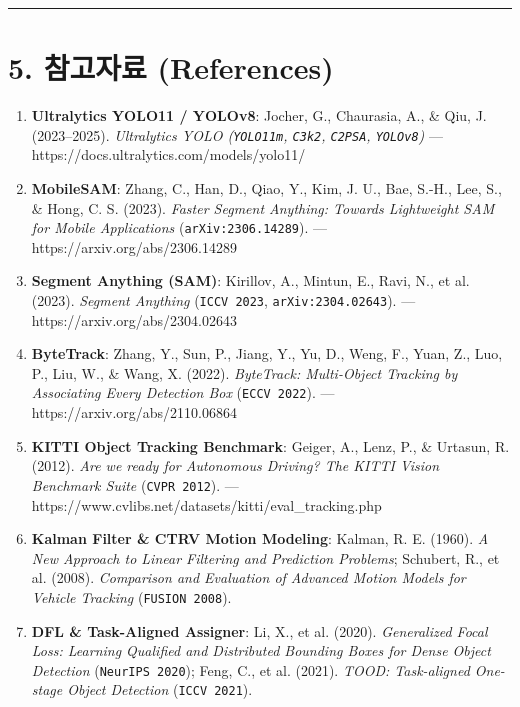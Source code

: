 \documentclass[10.5pt,a4paper]{article}
\begin{document}
\par\noindent\rule{\textwidth}{0.4pt}\par\medskip

\section{5. 참고자료 (References)}

\begin{enumerate}[leftmargin=1.8em,itemsep=2pt]
\item \textbf{Ultralytics YOLO11 / YOLOv8}: Jocher, G., Chaurasia, A., \& Qiu, J. (2023--2025). \textit{Ultralytics YOLO (\texttt{YOLO11m}, \texttt{C3k2}, \texttt{C2PSA}, \texttt{YOLOv8})} --- https:\allowbreak{}/\allowbreak{}/\allowbreak{}docs.\allowbreak{}ultralytics.\allowbreak{}com/\allowbreak{}models/\allowbreak{}yolo11/\allowbreak{}
\item \textbf{MobileSAM}: Zhang, C., Han, D., Qiao, Y., Kim, J. U., Bae, S.-H., Lee, S., \& Hong, C. S. (2023). \textit{Faster Segment Anything: Towards Lightweight SAM for Mobile Applications} (\texttt{arXiv:\allowbreak{}2306.\allowbreak{}14289}).\allowbreak{} --- https:\allowbreak{}/\allowbreak{}/\allowbreak{}arxiv.\allowbreak{}org/\allowbreak{}abs/\allowbreak{}2306.\allowbreak{}14289
\item \textbf{Segment Anything (SAM)}: Kirillov, A., Mintun, E., Ravi, N., et al. (2023). \textit{Segment Anything} (\texttt{ICCV 2023}, \texttt{arXiv:\allowbreak{}2304.\allowbreak{}02643}).\allowbreak{} --- https:\allowbreak{}/\allowbreak{}/\allowbreak{}arxiv.\allowbreak{}org/\allowbreak{}abs/\allowbreak{}2304.\allowbreak{}02643
\item \textbf{ByteTrack}: Zhang, Y., Sun, P., Jiang, Y., Yu, D., Weng, F., Yuan, Z., Luo, P., Liu, W., \& Wang, X. (2022). \textit{ByteTrack: Multi-Object Tracking by Associating Every Detection Box} (\texttt{ECCV 2022}).\allowbreak{} --- https:\allowbreak{}/\allowbreak{}/\allowbreak{}arxiv.\allowbreak{}org/\allowbreak{}abs/\allowbreak{}2110.\allowbreak{}06864
\item \textbf{KITTI Object Tracking Benchmark}: Geiger, A., Lenz, P., \& Urtasun, R. (2012). \textit{Are we ready for Autonomous Driving? The KITTI Vision Benchmark Suite} (\texttt{CVPR 2012}).\allowbreak{} --- https:\allowbreak{}/\allowbreak{}/\allowbreak{}www.\allowbreak{}cvlibs.\allowbreak{}net/\allowbreak{}datasets/\allowbreak{}kitti/\allowbreak{}eval\_\allowbreak{}tracking.\allowbreak{}php
\item \textbf{Kalman Filter \& CTRV Motion Modeling}: Kalman, R. E. (1960). \textit{A New Approach to Linear Filtering and Prediction Problems}; Schubert, R., et al. (2008). \textit{Comparison and Evaluation of Advanced Motion Models for Vehicle Tracking} (\texttt{FUSION 2008}).
\item \textbf{DFL \& Task-Aligned Assigner}: Li, X., et al. (2020). \textit{Generalized Focal Loss: Learning Qualified and Distributed Bounding Boxes for Dense Object Detection} (\texttt{NeurIPS 2020}); Feng, C., et al. (2021). \textit{TOOD: Task-aligned One-stage Object Detection} (\texttt{ICCV 2021}).
\end{enumerate}
\end{document}

